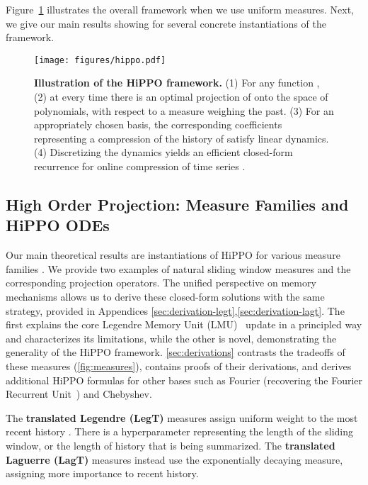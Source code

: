 \documentclass{article}
\begin{document}
Figure~\ref{fig:framework} illustrates the overall framework when we use uniform measures.
Next, we give our main results showing  for several concrete instantiations of the framework.

\begin{figure}
  \centering
  \texttt{[image: figures/hippo.pdf]}
  \caption{
    \textbf{Illustration of the HiPPO framework.}
    (1) For any function , (2) at every time  there is an optimal projection  of  onto the space of polynomials, with respect to a measure  weighing the past.
    (3) For an appropriately chosen basis, the corresponding coefficients  representing a compression of the history of  satisfy linear dynamics.
    (4) Discretizing the dynamics yields an efficient closed-form recurrence for online compression of time series .
  }
  \label{fig:framework}
\end{figure}


\subsection{High Order Projection: Measure Families and HiPPO ODEs}
\label{subsec:high_order_projection}

Our main theoretical results are instantiations of HiPPO for various measure families .
We provide two examples of natural sliding window measures and the corresponding projection operators.
The unified perspective on memory mechanisms allows us to derive these closed-form solutions with the same strategy, provided in
Appendices \ref{sec:derivation-legt},\ref{sec:derivation-lagt}.
The first explains the core Legendre Memory Unit (LMU)~\citep{voelker2019legendre} update in a principled way and characterizes its limitations,
while the other is novel, demonstrating the generality of the HiPPO framework.
\cref{sec:derivations} contrasts the tradeoffs of these measures
(\cref{fig:measures}), contains proofs of their derivations, and derives
additional HiPPO formulas for other bases such as Fourier (recovering the
Fourier Recurrent Unit~\citep{zhang2018learning}) and Chebyshev.





The \textbf{translated Legendre (LegT)} measures assign uniform weight to the most recent history .
There is a hyperparameter  representing the length of the sliding window,
or the length of history that is being summarized.
The \textbf{translated Laguerre (LagT)} measures instead use the exponentially decaying measure, assigning more importance to recent history.
\end{document}
